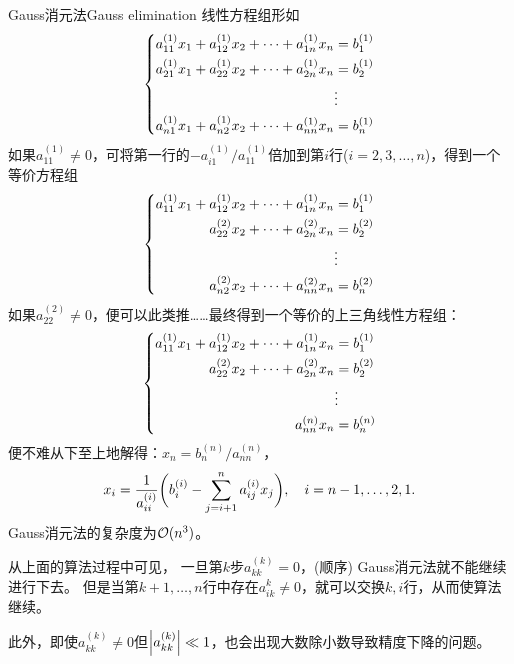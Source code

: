 \begin{theorem}
    {Gauss消元法}{Gauss elimination}
    线性方程组形如
    \begin{equation*}
        \left\{\begin{aligned}
            a_{11}^{(1)}x_1+a_{12}^{(1)}x_2+\cdots+a_{1n}^{(1)}x_n&=b_1^{(1)}\\
            a_{21}^{(1)}x_1+a_{22}^{(1)}x_2+\cdots+a_{2n}^{(1)}x_n&=b_2^{(1)}\\
            &\vdots\\
            a_{n1}^{(1)}x_1+a_{n2}^{(1)}x_2+\cdots+a_{nn}^{(1)}x_n&=b_n^{(1)}
        \end{aligned}\right.
    \end{equation*}
    如果$a_{11}^{(1)}\neq 0$，可将第一行的$-a_{i1}^{(1)}/a_{11}^{(1)}$倍加到第$i$行($i=2,3,\ldots,n$)，得到一个等价方程组
    \begin{equation*}
        \left\{\begin{aligned}
            a_{11}^{(1)}x_1+a_{12}^{(1)}x_2+\cdots+a_{1n}^{(1)}x_n&=b_1^{(1)}\\
            a_{22}^{(2)}x_2+\cdots+a_{2n}^{(2)}x_n&=b_2^{(2)}\\
            &\vdots\\
            a_{n2}^{(2)}x_2+\cdots+a_{nn}^{(2)}x_n&=b_n^{(2)}
        \end{aligned}\right.
    \end{equation*}
    如果$a_{22}^{(2)}\neq 0$，便可以此类推……最终得到一个等价的上三角线性方程组：
    \begin{equation*}
        \left\{\begin{aligned}
            a_{11}^{(1)}x_1+a_{12}^{(1)}x_2+\cdots+a_{1n}^{(1)}x_n&=b_1^{(1)}\\
            a_{22}^{(2)}x_2+\cdots+a_{2n}^{(2)}x_n&=b_2^{(2)}\\
            &\vdots\\
            a_{nn}^{(n)}x_n&=b_n^{(n)}
        \end{aligned}\right.
    \end{equation*}
    便不难从下至上地解得：$x_n=b_n^{(n)}/a_{nn}^{(n)}$，
    \begin{equation}
        x_i=\frac{1}{a_{ii}^{(i)}}\biggl(b_{i}^{(i)}-\sum_{j=i+1}^na_{ij}^{(i)}x_j\biggr),\quad i=n-1,\ldots,2,1.
    \end{equation}
    Gauss消元法的复杂度为$\mathcal O(n^3)$。
\end{theorem}

\begin{remark}
    从上面的算法过程中可见，
    一旦第$k$步$a_{kk}^{(k)}=0$，(顺序) Gauss消元法就不能继续进行下去。
    但是当第$k+1,\ldots,n$行中存在$a_{ik}^{k}\neq 0$，就可以交换$k,i$行，从而使算法继续。

    此外，即使$a_{kk}^{(k)}\neq 0$但$\left\lvert a_{kk}^{(k)}\right\rvert\ll 1$，也会出现大数除小数导致精度下降的问题。
\end{remark}

